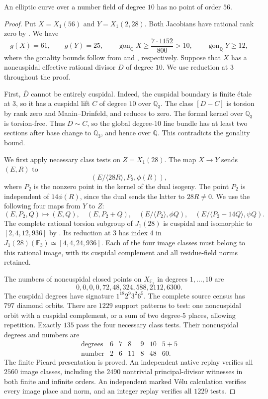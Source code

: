 \begin{proposition}\label{prop:decic-no56}
An elliptic curve over a number field of degree $10$ has no point
of order $56$.
\end{proposition}
\begin{proof}
Put $X=X_1(56)$ and $Y=X_1(2,28)$. Both Jacobians have rational
rank zero by \cite[Theorem~3.1]{DEHMZ}. We have
\[
 g(X)=61,\qquad g(Y)=25,\qquad
 \operatorname{gon}_{\mathbb Q}X\geq\frac{7\cdot1152}{800}>10,
 \qquad \operatorname{gon}_{\mathbb Q}Y\geq12,
\]
where the gonality bounds follow from \cite{Abramovich} and
\cite[Table~1]{NV}, respectively.
Suppose that $X$ has a noncuspidal effective rational divisor $D$
of degree $10$. We use reduction at $3$ throughout the proof.

First, $\overline D$ cannot be entirely cuspidal. Indeed, the
cuspidal boundary is finite \'etale at $3$, so it has a cuspidal
lift $C$ of degree $10$ over $\mathbb Q_3$. The class $[D-C]$ is
torsion by rank zero and Manin--Drinfeld, and reduces to zero.
The formal kernel over $\mathbb Q_3$ is torsion-free. Thus $D\sim C$,
so the global degree-$10$ line bundle has at least two sections
after base change to $\mathbb Q_3$, and hence over $\mathbb Q$.
This contradicts the gonality bound.

We first apply necessary class tests on $Z=X_1(28)$.
The map $X\to Y$ sends $(E,R)$ to
\[
 (E/\langle28R\rangle,P_2,\phi(R)),
\]
where $P_2$ is the nonzero point in the kernel of the dual isogeny.
The point $P_2$ is independent of $14\phi(R)$, since the dual sends
the latter to $28R\ne0$.
We use the following four maps from $Y$ to $Z$:
\[
 (E,P_2,Q)\longmapsto(E,Q),\quad(E,P_2+Q),\quad
 (E/\langle P_2\rangle,\phi Q),\quad
 (E/\langle P_2+14Q\rangle,\psi Q).
\]
The complete rational torsion subgroup of $J_1(28)$ is cuspidal
and isomorphic to $[2,4,12,936]$ by
\cite[Theorem~4.13]{DEHMZ}. Its reduction at $3$ has index $4$
in $J_1(28)(\mathbb F_3)\simeq[4,4,24,936]$. Each of the four
image classes must belong to this rational image, with its
cuspidal complement and all residue-field norms retained.

The numbers of noncuspidal closed points on $X_{\mathbb F_3}$
in degrees $1,\ldots,10$ are
\[
             0,0,0,0,72,48,324,588,2112,6300.
\]
The cuspidal degrees have signature $1^{18}2^9 3^2 6^5$.
The complete source census has $797$ diamond orbits. There are
$1229$ support patterns to test: one noncuspidal orbit with a
cuspidal complement, or a sum of two degree-$5$ places, allowing
repetition. Exactly $135$ pass the four necessary class tests.
Their noncuspidal degrees and numbers are
\[
\begin{array}{c|rrrrrr}
 \text{degrees}&6&7&8&9&10&5+5\\\hline
 \text{number}&2&6&11&8&48&60.
\end{array}
\]
The finite Picard presentation is proved. An independent native
replay verifies all $2560$ image classes, including the $2490$
nontrivial principal-divisor witnesses in both finite and infinite
orders. An independent marked V\'elu calculation verifies every
image place and norm, and an integer replay verifies all $1229$ tests.


\end{proof}
